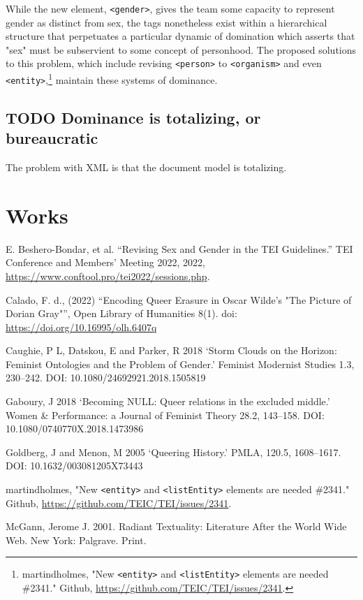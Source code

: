 \documentclass[11pt]{article}
\begin{document}
While the new element, \texttt{<gender>}, gives the team some capacity to
represent gender as distinct from sex, the tags nonetheless exist
within a hierarchical structure that perpetuates a particular dynamic
of domination which asserts that "sex" must be subservient to some
concept of personhood. The proposed solutions to this problem, which
include revising \texttt{<person>} to \texttt{<organism>} and even \texttt{<entity>},\footnote{martindholmes, "New \texttt{<entity>} and \texttt{<listEntity>} elements are
needed \#2341."  Github, \url{https://github.com/TEIC/TEI/issues/2341}.}
maintain these systems of dominance.

\subsection{{\bfseries\sffamily TODO} Dominance is totalizing, or bureaucratic}
\label{sec:org3e2bab2}
The problem with XML is that the document model is totalizing. 


\section{Works}
\label{sec:org6e60698}
E. Beshero-Bondar, et al. “Revising Sex and Gender in the TEI Guidelines.” TEI Conference and Members’ Meeting 2022, 2022, \url{https://www.conftool.pro/tei2022/sessions.php}.

Calado, F. d., (2022) “Encoding Queer Erasure in Oscar Wilde’s "The
Picture of Dorian Gray"”, Open Library of Humanities 8(1). doi:
\url{https://doi.org/10.16995/olh.6407q}

Caughie, P L, Datskou, E and Parker, R 2018 ‘Storm Clouds on
the Horizon: Feminist Ontologies and the Problem of Gender.' Feminist
Modernist Studies 1.3, 230--242. DOI: 10.1080/24692921.2018.1505819

Gaboury, J 2018 ‘Becoming NULL: Queer relations in the
excluded middle.' Women \& Performance: a Journal of Feminist Theory
28.2, 143--158. DOI: 10.1080/0740770X.2018.1473986

Goldberg, J and Menon, M 2005 ‘Queering History.' PMLA, 120.5,
1608--1617. DOI: 10.1632/003081205X73443

martindholmes, "New \texttt{<entity>} and \texttt{<listEntity>} elements are
needed \#2341."  Github, \url{https://github.com/TEIC/TEI/issues/2341}.

McGann, Jerome J. 2001. Radiant Textuality: Literature After the World
Wide Web. New York: Palgrave. Print.
\end{document}
